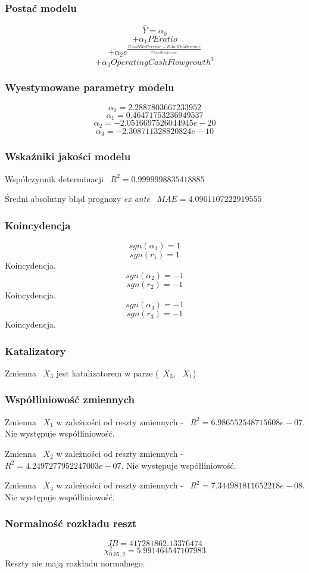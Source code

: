 \documentclass{article}
\begin{document}
\subsubsection{Postać modelu}
\[ \hat{Y} = \alpha_0\]
\[+\alpha_{1}PE ratio\]
\[+\alpha_{2}e^{\frac{RAndD to Revenue - \overline{RAndD to Revenue}}{\sigma_{RAndD to Revenue}}}\]
\[+\alpha_{3}Operating Cash Flow growth^3\]
\subsubsection{Wyestymowane parametry modelu}
\[\alpha_{0} = 2.2887803667233952\]
\[\alpha_{1} = 0.46471753236949537\]
\[\alpha_{2} = -2.0516697526044945e-20\]
\[\alpha_{3} = -2.308711328820824e-10\]
\subsubsection{Wskaźniki jakości modelu}
Współczynnik determinacji ~$R^2 = 0.9999998835418885$

Średni absolutny błąd prognozy \textit{ex ante} ~$MAE = 4.0961107222919555$

\subsubsection{Koincydencja}
\[sgn(\alpha_{1}) = 1\]
\[sgn(r_{1}) = 1\]
Koincydencja.
\[sgn(\alpha_{2}) = -1\]
\[sgn(r_{2}) = -1\]
Koincydencja.
\[sgn(\alpha_{3}) = -1\]
\[sgn(r_{3}) = -1\]
Koincydencja.
\subsubsection{Katalizatory}
Zmienna ~$X_{3}$ jest katalizatorem w parze (~$X_{3}$, ~$X_{1}$)

\subsubsection{Współliniowość zmiennych}
Zmienna ~$X_{1}$ w zależności od reszty zmiennych - ~$R^2 = 6.986552548715608e-07$.
Nie występuje współliniowość.

Zmienna ~$X_{2}$ w zależności od reszty zmiennych - ~$R^2 = 4.2497277952247003e-07$.
Nie występuje współliniowość.

Zmienna ~$X_{3}$ w zależności od reszty zmiennych - ~$R^2 = 7.344981811652218e-08$.
Nie występuje współliniowość.

\subsubsection{Normalność rozkładu reszt}
\[JB = 417281862.13376474\]
\[\chi^2_{0.05, 2} = 5.991464547107983\]
Reszty nie mają rozkładu normalnego.
\end{document}
